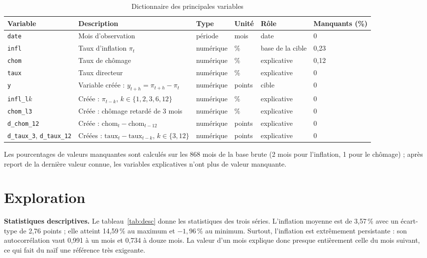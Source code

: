 \documentclass[11pt,a4paper]{article}
\begin{document}
\begin{table}[H]\centering\small
\caption{Dictionnaire des principales variables}\label{tab:dico}
\begin{tabular}{@{}p{2.4cm}p{4.8cm}p{1.5cm}p{1cm}p{1.9cm}p{1.2cm}@{}}
\toprule
Variable & Description & Type & Unité & Rôle & Manquants (\%)\\\midrule
\texttt{date} & Mois d'observation & période & mois & date & 0\\
\texttt{infl} & Taux d'inflation $\pi_t$ & numérique & \% & base de la cible & 0,23\\
\texttt{chom} & Taux de chômage & numérique & \% & explicative & 0,12\\
\texttt{taux} & Taux directeur & numérique & \% & explicative & 0\\
\texttt{y} & Variable créée : $y_{t+h}=\pi_{t+h}-\pi_t$ & numérique & points & cible & 0\\
\texttt{infl\_l}$k$ & Créée : $\pi_{t-k}$, $k\in\{1,2,3,6,12\}$ & numérique & \% & explicative & 0\\
\texttt{chom\_l3} & Créée : chômage retardé de 3 mois & numérique & \% & explicative & 0\\
\texttt{d\_chom\_12} & Créée : $\text{chom}_t-\text{chom}_{t-12}$ & numérique & points & explicative & 0\\
\texttt{d\_taux\_3}, \texttt{d\_taux\_12} & Créées : $\text{taux}_t-\text{taux}_{t-k}$, $k\in\{3,12\}$ & numérique & points & explicative & 0\\
\bottomrule
\end{tabular}
\end{table}
{\small Les pourcentages de valeurs manquantes sont calculés sur les 868 mois de la base brute (2 mois pour l'inflation, 1 pour le chômage) ; après report de la dernière valeur connue, les variables explicatives n'ont plus de valeur manquante.}

\section{Exploration}
\textbf{Statistiques descriptives.} Le tableau~\ref{tab:desc} donne les statistiques des trois séries. L'inflation moyenne est de 3,57\,\% avec un écart-type de 2,76 points ; elle atteint 14,59\,\% au maximum et $-1{,}96$\,\% au minimum. Surtout, l'inflation est extrêmement persistante : son autocorrélation vaut 0,991 à un mois et 0,734 à douze mois. La valeur d'un mois explique donc presque entièrement celle du mois suivant, ce qui fait du naïf une référence très exigeante.
\end{document}
